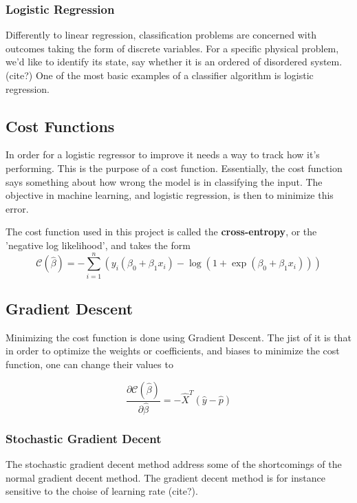 \subsubsection{Logistic Regression}\label{seq:logistic}
Differently to linear regression, classification problems
are concerned with outcomes taking the form of discrete variables.
For a specific physical problem, we'd like to identify its state, say whether
it is an ordered of disordered system. (cite?) One of the most basic examples
of a classifier algorithm is logistic regression.

\subsection{Cost Functions}\label{seq:cost-functions}
In order for a logistic regressor to improve it needs a way to
track how it's performing. This is the purpose of a cost function. Essentially,
the cost function says something about how wrong the model is in classifying the
input. The objective in machine learning, and logistic regression, is then to minimize
this error.

The cost function used in this project is called the \textbf{cross-entropy}, or the
'negative log likelihood', and takes the form
\begin{equation}\label{eq:cross-entropy}
	\mathcal{C}(\hat{\beta})=-\sum_{i=1}^n  \left(y_i(\beta_0+\beta_1x_i) -\log{(1+\exp{(\beta_0+\beta_1x_i)})}\right)
\end{equation}

\subsection{Gradient Descent}\label{seq:gradient}
Minimizing the cost function is done using Gradient Descent.
The jist of it is that in order to optimize the weights or coefficients,
and biases to minimize the cost function, one can change their values to

\begin{equation}\label{eq:delta-c}
	\frac{\partial \mathcal{C}(\hat{\beta})}{\partial \hat{\beta}} = -\hat{X}^T\left(\hat{y}-\hat{p}\right)
\end{equation}

\subsubsection{Stochastic Gradient Decent}
The stochastic gradient decent method address some of the shortcomings
of the normal gradient decent method. The gradient decent method is
for instance sensitive to the choise of learning rate (cite?).

